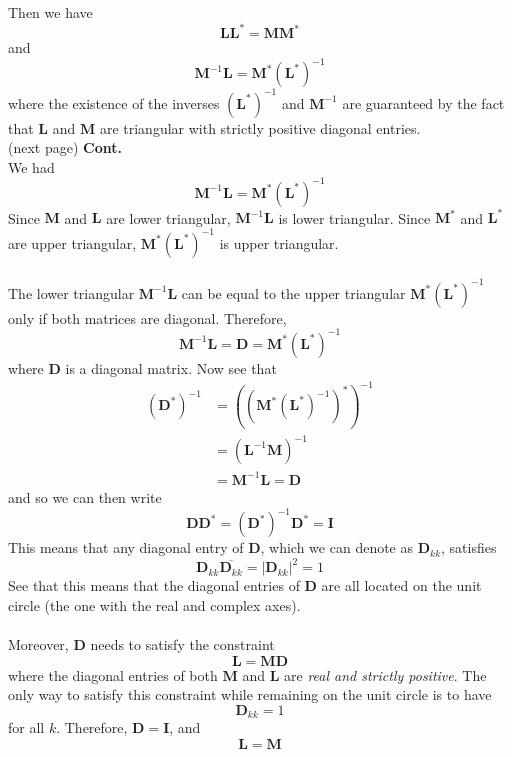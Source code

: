 \documentclass{report}
\begin{document}
Then we have
\begin{equation*}
\bm{LL}^*=\bm{MM}^*
\end{equation*}
and
\begin{equation*}
\bm M^{-1}\bm L=\bm M^*(\bm L^*)^{-1}
\end{equation*}
where the existence of the inverses $(\bm L^*)^{-1}$ and $\bm M^{-1}$ are guaranteed by the fact that $\bm L$ and $\bm M$ are triangular with 
strictly positive diagonal entries.\\
(next page)\newpage
\noindent\textbf{Cont.}\\
We had
\begin{equation*}
\bm M^{-1}\bm L=\bm M^*(\bm L^*)^{-1}
\end{equation*}
Since $\bm M$ and $\bm L$ are lower triangular, $\bm M^{-1}\bm L$ is lower triangular. Since $\bm M^*$ and $\bm L^*$ are upper triangular,
$\bm M^*(\bm L^*)^{-1}$ is upper triangular.\\
\vspace{1mm}\\
The lower triangular $\bm M^{-1}\bm L$ can be equal to the upper triangular $\bm M^*(\bm L^*)^{-1}$ only if both matrices are diagonal. 
Therefore,
\begin{equation*}
\bm M^{-1}\bm L=\bm D=\bm M^*(\bm L^*)^{-1}
\end{equation*}
where $\bm D$ is a diagonal matrix. Now see that
\begin{align*}
(\bm D^*)^{-1}&=((\bm M^*(\bm L^*)^{-1})^*)^{-1}\\
&=(\bm L^{-1}\bm M)^{-1}\\
&=\bm M^{-1}\bm L=\bm D
\end{align*}
and so we can then write
\begin{equation*}
\bm{DD}^*=(\bm D^*)^{-1}\bm D^*=\bm I
\end{equation*}
This means that any diagonal entry of $\bm D$, which we can denote as $\bm D_{kk}$, satisfies
\begin{equation*}
\bm D_{kk}\overline{\bm D_{kk}}=|\bm D_{kk}|^2=1
\end{equation*}
See that this means that the diagonal entries of $\bm D$ are all located on the unit circle (the one with the real and complex axes).\\
\vspace{1mm}\\
Moreover, $\bm D$ needs to satisfy the constraint
\begin{equation*}
\bm L=\bm{MD}
\end{equation*}
where the diagonal entries of both $\bm M$ and $\bm L$ are \textit{real and strictly positive}. The only way to satisfy this constraint 
while remaining on the unit circle is to have
\begin{equation*}
\bm D_{kk}=1
\end{equation*}
for all $k$. Therefore, $\bm D=\bm I$, and 
\begin{equation*}
\bm L=\bm M
\end{equation*}
\newpage
\end{document}
